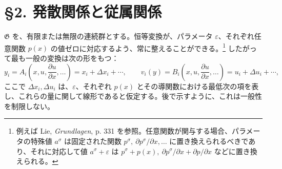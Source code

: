 \documentclass[11pt]{article}
\newcommand{\D}{\Delta}
\newcommand{\eps}{\varepsilon}
\providecommand{\G}{\mathfrak G}
\providecommand{\p}{\partial}
\begin{document}
\section*{\S{}2. 発散関係と従属関係}

\(\G\) を、有限または無限の連続群とする。恒等変換が、パラメータ \(\eps\)、それぞれ任意関数 \(p(x)\) の値ゼロに対応するよう、常に整えることができる。\footnote{例えば Lie, \emph{Grundlagen}, p. 331 を参照。任意関数が関与する場合、パラメータの特殊値 \(a^\sigma\) は固定された関数 \(p^\sigma,\ \p p^\sigma/\p x,\ldots\) に置き換えられるべきであり、それに対応して値 \(a^\sigma+\eps\) は \(p^\sigma+p(x),\ \p p^\sigma/\p x+\p p/\p x\) などに置き換えられる。} したがって最も一般の変換は次の形をもつ：
\[
y_i=A_i\!\left(x,u,\frac{\p u}{\p x},\ldots\right)=x_i+\D x_i+\cdots,\qquad
v_i(y)=B_i\!\left(x,u,\frac{\p u}{\p x},\ldots\right)=u_i+\D u_i+\cdots,
\]
ここで \(\D x_i,\D u_i\) は、\(\eps\)、それぞれ \(p(x)\) とその導関数における最低次の項を表し、これらの量に関して線形であると仮定する。後で示すように、これは一般性を制限しない。
\end{document}
